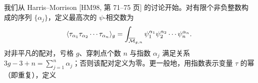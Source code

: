 

我们从 Harris--Morrison [HM98, 第 71--75 页] 的讨论开始。对有限个非负整数构成的序列 $\{\alpha_j\}$，定义最高次的 $\psi$-相交数为
\[
\langle\tau_{\alpha_1}\tau_{\alpha_2}\cdots\tau_{\alpha_n}\rangle_g=\int_{\overline{\mathcal{M}}_{g,n}}\psi_1^{\alpha_1}\psi_2^{\alpha_2}\cdots\psi_n^{\alpha_n}.
\]
对非平凡的配对，亏格 $g$、穿刺点个数 $n$ 与指数 $\alpha_j$ 满足关系 $3g-3+n=\sum_{j=1}^n\alpha_j$；否则该配对定义为零。更一般地，用指数表示变量 $\tau$ 的幂（即重复），定义


